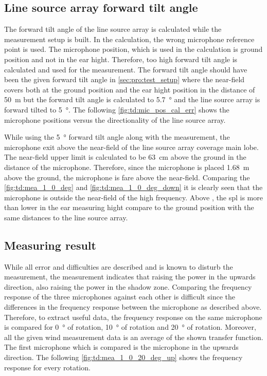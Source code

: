 \subsection{Line source array forward tilt angle}\label{sec:des:measuring_angle}
The forward tilt angle of the line source array is calculated while the measurement setup is built. In the calculation, the wrong microphone reference point is used. The microphone position, which is used in the calculation is ground position and not in the ear hight. Therefore, too high forward tilt angle is calculated and used for the measurement. The forward tilt angle should have been the given forward tilt angle in \autoref{sec:pro:test_setup} where the near-field covers both at the ground position and the ear hight position in the distance of \SI{50}{\meter} but the forward tilt angle is calculated to \SI{5.7}{\degree} and the line source array is forward tilted to \SI{5}{\degree}. The following \autoref{fig:td:mic_pos_cal_err} shows the microphone positions versus the directionality of the line source array.



While using the \SI{5}{\degree} forward tilt angle along with the measurement, the microphone exit above the near-field of the line source array coverage main lobe. The near-field upper limit is calculated to be \SI{63}{\centi\meter} above the ground in the distance of the microphone. Therefore, since the microphone is placed \SI{1.68}{\meter} above the ground, the microphone is fare above the near-field. Comparing the \autoref{fig:td:mea_1_0_deg} and \autoref{fig:td:mea_1_0_deg_down} it is clearly seen that the microphone is outside the near-field of the high frequency. Above , the \gls{spl} is more than  lower in the ear measuring hight compare to the ground position with the same distances to the line source array. 

\subsection{Measuring result}\label{sec:des:measuring_result}
While all error and difficulties are described and is known to disturb the measurement, the measurement indicates that raising the power in the upwards direction, also raising the power in the shadow zone. Comparing the frequency response of the three microphones against each other is difficult since the differences in the frequency response between the microphone as described above. Therefore, to extract useful data, the frequency response on the same microphone is compared for \SI{0}{\degree} of rotation, \SI{10}{\degree} of rotation and \SI{20}{\degree} of rotation. Moreover, all the given wind measurement data is an average of the shown transfer function.
The first microphone which is compared is the microphone in the upwards direction. The following \autoref{fig:td:mea_1_0_20_deg_up} shows the frequency response for every rotation.

